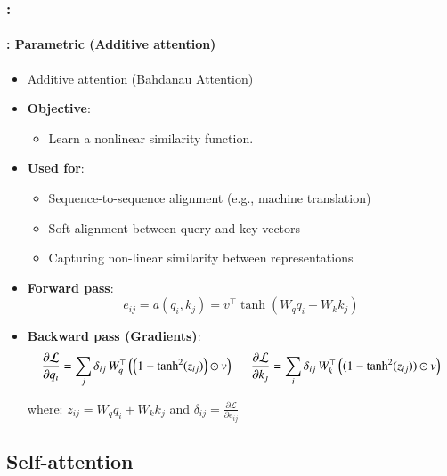 \documentclass[xcolor=table]{beamer}
\begin{document}
	\begin{frame}
		\frametitle{\insertshortsubtitle: \insertsection}
		\framesubtitle{\insertsubsection: Parametric (Additive attention)}
		
		\begin{itemize}
			\item Additive attention (Bahdanau Attention)
			
			\item \textbf{Objective}:
			\begin{itemize}
				\item Learn a nonlinear similarity function.
			\end{itemize}
			
			\item \textbf{Used for}:
			\begin{itemize}
				\item Sequence-to-sequence alignment (e.g., machine translation)
				\item Soft alignment between query and key vectors
				\item Capturing non-linear similarity between representations
			\end{itemize}
			
			\item \textbf{Forward pass}:
			\[e_{ij} = a(q_i, k_j) = v^\top \tanh(W_q q_i + W_k k_j)\]
			
			\item \textbf{Backward pass (Gradients)}:
			\small
			\[
			\frac{\partial \mathcal{L}}{\partial q_i}
			=
			\sum_j \delta_{ij}\, W_q^\top \left( \left(1 - \tanh^2(z_{ij})\right) \odot v \right)
			\hskip.5cm
			\frac{\partial \mathcal{L}}{\partial k_j}
			=
			\sum_i \delta_{ij}\,
			W_k^\top \left( (1 - \tanh^2(z_{ij})) \odot v \right)
			\]
			
			\normalsize where: $z_{ij} = W_q q_i + W_k k_j$ and $ \delta_{ij} =  \frac{\partial \mathcal{L}}{\partial e_{ij}}$
			
		\end{itemize}
	\end{frame}
	
	\subsection{Self-attention}
	
\end{document}
